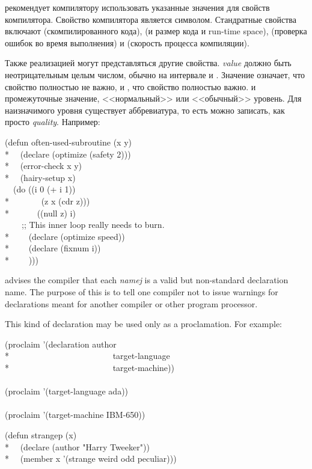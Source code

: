 \begin{flushdesc}
\item[\cdf{optimize}]
рекомендует компилятору использовать указанные значения для свойств компилятора.
Свойство компилятора является символом. Стандратные свойства включают 
 (скомпилированного кода),  (и размер кода и run-time
space),  (проверка ошибок во время выполнения) и
 (скорость процесса компиляции).

Также реализацией могут представляться другие свойства. \emph{value} должно быть
неотрицательным целым числом, обычно на интервале  и . Значение
 означает, что свойство полностью не важно, и , что свойство
полностью важно.
 и  промежуточные значение,  <<нормальный>> или <<обычный>>
уровень.
Для наизначимого уровня существует аббревиатура, то есть 
можно записать, как просто \emph{quality}.
Например:
\begin{lisp}
(defun often-used-subroutine (x y) \\*
~~(declare (optimize (safety 2))) \\*
~~(error-check x y) \\*
~~(hairy-setup x) \\
~~(do ((i 0 (+ i 1)) \\*
~~~~~~~(z x (cdr z))) \\*
~~~~~~((null z) i) \\
~~~~;; This inner loop really needs to burn. \\*
~~~~(declare (optimize speed)) \\*
~~~~(declare (fixnum i)) \\*
~~~~)))
\end{lisp}


\item[\cdf{declaration}]
 advises the compiler
that each \emph{namej} is a valid but non-standard declaration name.
The purpose of this is to tell one compiler not to issue warnings
for declarations meant for another compiler or other program processor.

\begin{obsolete}
This kind of declaration may be used only as a proclamation.
For example:
\begin{lisp}
(proclaim '(declaration author \\*
~~~~~~~~~~~~~~~~~~~~~~~~target-language \\*
~~~~~~~~~~~~~~~~~~~~~~~~target-machine)) \\
 \\
(proclaim '(target-language ada)) \\
 \\
(proclaim '(target-machine IBM-650))
\end{lisp}
\newpage%
\begin{lisp}
(defun strangep (x) \\*
~~(declare (author "Harry Tweeker")) \\*
~~(member x '(strange weird odd peculiar)))
\end{lisp}
\end{obsolete}


\end{flushdesc}

